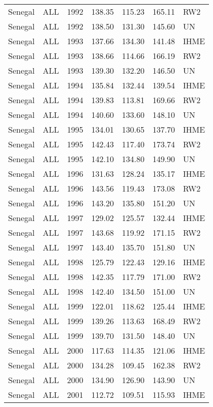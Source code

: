 \begin{longtable}{lllrrrl}
  Senegal & ALL & 1992 & 138.35 & 115.23 & 165.11 & RW2 \\ 
  Senegal & ALL & 1992 & 138.50 & 131.30 & 145.60 & UN \\ 
  Senegal & ALL & 1993 & 137.66 & 134.30 & 141.48 & IHME \\ 
  Senegal & ALL & 1993 & 138.66 & 114.66 & 166.19 & RW2 \\ 
  Senegal & ALL & 1993 & 139.30 & 132.20 & 146.50 & UN \\ 
  Senegal & ALL & 1994 & 135.84 & 132.44 & 139.54 & IHME \\ 
  Senegal & ALL & 1994 & 139.83 & 113.81 & 169.66 & RW2 \\ 
  Senegal & ALL & 1994 & 140.60 & 133.60 & 148.10 & UN \\ 
  Senegal & ALL & 1995 & 134.01 & 130.65 & 137.70 & IHME \\ 
  Senegal & ALL & 1995 & 142.43 & 117.40 & 173.74 & RW2 \\ 
  Senegal & ALL & 1995 & 142.10 & 134.80 & 149.90 & UN \\ 
  Senegal & ALL & 1996 & 131.63 & 128.24 & 135.17 & IHME \\ 
  Senegal & ALL & 1996 & 143.56 & 119.43 & 173.08 & RW2 \\ 
  Senegal & ALL & 1996 & 143.20 & 135.80 & 151.20 & UN \\ 
  Senegal & ALL & 1997 & 129.02 & 125.57 & 132.44 & IHME \\ 
  Senegal & ALL & 1997 & 143.68 & 119.92 & 171.15 & RW2 \\ 
  Senegal & ALL & 1997 & 143.40 & 135.70 & 151.80 & UN \\ 
  Senegal & ALL & 1998 & 125.79 & 122.43 & 129.16 & IHME \\ 
  Senegal & ALL & 1998 & 142.35 & 117.79 & 171.00 & RW2 \\ 
  Senegal & ALL & 1998 & 142.40 & 134.50 & 151.00 & UN \\ 
  Senegal & ALL & 1999 & 122.01 & 118.62 & 125.44 & IHME \\ 
  Senegal & ALL & 1999 & 139.26 & 113.63 & 168.49 & RW2 \\ 
  Senegal & ALL & 1999 & 139.70 & 131.50 & 148.40 & UN \\ 
  Senegal & ALL & 2000 & 117.63 & 114.35 & 121.06 & IHME \\ 
  Senegal & ALL & 2000 & 134.28 & 109.45 & 162.38 & RW2 \\ 
  Senegal & ALL & 2000 & 134.90 & 126.90 & 143.90 & UN \\ 
  Senegal & ALL & 2001 & 112.72 & 109.51 & 115.93 & IHME \\ 

\end{longtable}
